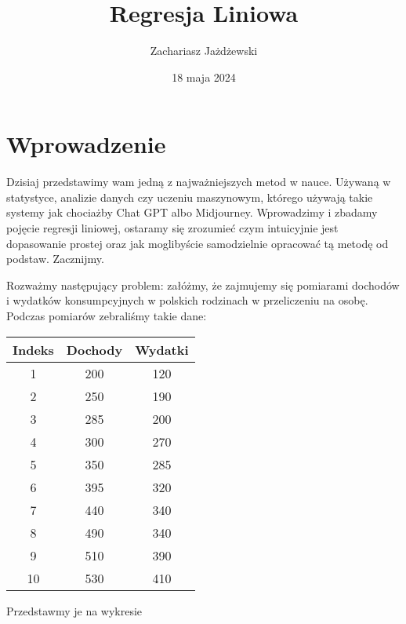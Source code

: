 \documentclass[a4paper,12pt]{article}
\title{Regresja Liniowa}
\author{Zachariasz Jażdżewski}
\date{18 maja 2024}
\begin{document}
\maketitle


\section{Wprowadzenie}
Dzisiaj przedstawimy wam jedną z najważniejszych metod w nauce. Używaną w statystyce, analizie danych czy uczeniu maszynowym, którego używają takie systemy jak chociażby Chat GPT albo Midjourney. Wprowadzimy i zbadamy pojęcie regresji liniowej, ostaramy się zrozumieć czym intuicyjnie jest dopasowanie prostej oraz jak moglibyście samodzielnie opracować tą metodę od podstaw. Zacznijmy.

Rozważmy następujący problem: załóżmy, że zajmujemy się pomiarami dochodów i wydatków konsumpcyjnych w polskich rodzinach w przeliczeniu na osobę. Podczas pomiarów zebraliśmy takie dane:

\begin{table}[!h]
	\centering
	\begin{tabular}{ ccc }
		\hline
		\bfseries Indeks & \bfseries Dochody & \bfseries Wydatki \\ \hline
		1 & 200 & 120 \\
		2 & 250 & 190 \\
		3 & 285 & 200 \\
		4 & 300 & 270 \\
		5 & 350 & 285 \\
		6 & 395 & 320 \\
		7 & 440 & 340 \\
		8 & 490 & 340 \\
		9 & 510 & 390 \\
		10 & 530 & 410 \\
		\hline
	\end{tabular}
\end{table}

\newpage

Przedstawmy je na wykresie

\begin{figure}[h!]
	\centering
\end{figure}
\end{document}
